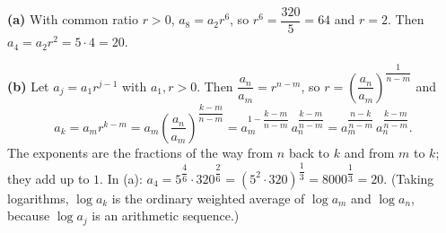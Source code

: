 \textbf{(a)} With common ratio $r>0$, $a_8=a_2r^6$, so $r^6=\dfrac{320}{5}=64$ and $r=2$. Then $a_4=a_2r^2=5\cdot4=\boxed{20}$.

\textbf{(b)} Let $a_j=a_1r^{j-1}$ with $a_1,r>0$. Then $\dfrac{a_n}{a_m}=r^{n-m}$, so $r=\left(\dfrac{a_n}{a_m}\right)^{\dfrac{1}{n-m}}$ and
\[
a_k=a_m r^{k-m}=a_m\left(\dfrac{a_n}{a_m}\right)^{\dfrac{k-m}{n-m}}=a_m^{1-\dfrac{k-m}{n-m}}\,a_n^{\dfrac{k-m}{n-m}}=a_m^{\dfrac{n-k}{n-m}}\,a_n^{\dfrac{k-m}{n-m}} .
\]
The exponents are the fractions of the way from $n$ back to $k$ and from $m$ to $k$; they add up to $1$. In (a): $a_4=5^{\dfrac{4}{6}}\cdot320^{\dfrac{2}{6}}=\left(5^2\cdot320\right)^{\dfrac{1}{3}}=8000^{\dfrac{1}{3}}=20$. (Taking logarithms, $\log a_k$ is the ordinary weighted average of $\log a_m$ and $\log a_n$, because $\log a_j$ is an arithmetic sequence.)
